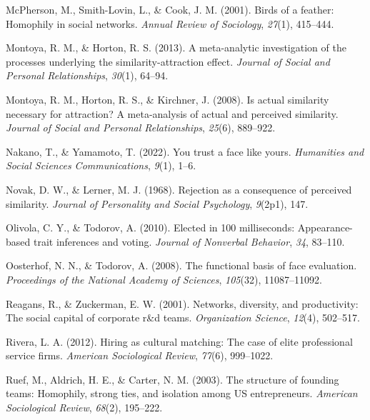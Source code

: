\documentclass[
  man,
  floatsintext,
  longtable,
  nolmodern,
  notxfonts,
  notimes,
  draftfirst,
  colorlinks=true,linkcolor=blue,citecolor=blue,urlcolor=blue]{apa7}
\newlength{\cslhangindent}
\newenvironment{CSLReferences}[2] %
 {\begin{list}{}{%
  \setlength{\itemindent}{0pt}
  \setlength{\leftmargin}{0pt}
  \setlength{\parsep}{0pt}
  \ifodd #1
   \setlength{\leftmargin}{\cslhangindent}
   \setlength{\itemindent}{-1\cslhangindent}
  \fi
  \setlength{\itemsep}{#2\baselineskip}}}
 {\end{list}}
\begin{document}
\begin{CSLReferences}{1}{0}
McPherson, M., Smith-Lovin, L., \& Cook, J. M. (2001). Birds of a
feather: Homophily in social networks. \emph{Annual Review of
Sociology}, \emph{27}(1), 415--444.

Montoya, R. M., \& Horton, R. S. (2013). A meta-analytic investigation
of the processes underlying the similarity-attraction effect.
\emph{Journal of Social and Personal Relationships}, \emph{30}(1),
64--94.

Montoya, R. M., Horton, R. S., \& Kirchner, J. (2008). Is actual
similarity necessary for attraction? A meta-analysis of actual and
perceived similarity. \emph{Journal of Social and Personal
Relationships}, \emph{25}(6), 889--922.

Nakano, T., \& Yamamoto, T. (2022). You trust a face like yours.
\emph{Humanities and Social Sciences Communications}, \emph{9}(1), 1--6.

Novak, D. W., \& Lerner, M. J. (1968). Rejection as a consequence of
perceived similarity. \emph{Journal of Personality and Social
Psychology}, \emph{9}(2p1), 147.

Olivola, C. Y., \& Todorov, A. (2010). Elected in 100 milliseconds:
Appearance-based trait inferences and voting. \emph{Journal of Nonverbal
Behavior}, \emph{34}, 83--110.

Oosterhof, N. N., \& Todorov, A. (2008). The functional basis of face
evaluation. \emph{Proceedings of the National Academy of Sciences},
\emph{105}(32), 11087--11092.

Reagans, R., \& Zuckerman, E. W. (2001). Networks, diversity, and
productivity: The social capital of corporate r\&d teams.
\emph{Organization Science}, \emph{12}(4), 502--517.

Rivera, L. A. (2012). Hiring as cultural matching: The case of elite
professional service firms. \emph{American Sociological Review},
\emph{77}(6), 999--1022.

Ruef, M., Aldrich, H. E., \& Carter, N. M. (2003). The structure of
founding teams: Homophily, strong ties, and isolation among US
entrepreneurs. \emph{American Sociological Review}, \emph{68}(2),
195--222.


\end{CSLReferences}
\end{document}
